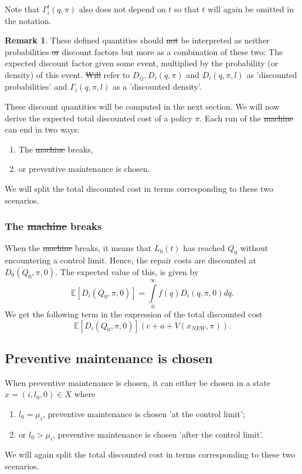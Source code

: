 \documentclass[a4paper]{thesis}
\theoremstyle{definition}
\newtheorem{remark}{Remark}[chapter]
\providecommand{\DIFaddtex}[1]{{\protect\color{blue}\uwave{#1}}} %
\providecommand{\DIFdeltex}[1]{{\protect\color{red}\sout{#1}}}                      %
\providecommand{\DIFaddbegin}{} %
\providecommand{\DIFaddend}{} %
\providecommand{\DIFdelbegin}{} %
\providecommand{\DIFdelend}{} %
\providecommand{\DIFadd}[1]{\texorpdfstring{\DIFaddtex{#1}}{#1}} %
\providecommand{\DIFdel}[1]{\texorpdfstring{\DIFdeltex{#1}}{}} %
\newcommand{\DIFscaledelfig}{0.5}
\newlength{\DIFdelgraphicswidth} %
\newlength{\DIFdelgraphicsheight} %
\newcommand{\DIFaddincludegraphics}[2][]{{\color{blue}\fbox{\DIFOincludegraphics[#1]{#2}}}} %
\newcommand{\DIFdelincludegraphics}[2][]{%
	\sbox{\DIFdelgraphicsbox}{\DIFOincludegraphics[#1]{#2}}%
	\settoboxwidth{\DIFdelgraphicswidth}{\DIFdelgraphicsbox} %
	\settoboxtotalheight{\DIFdelgraphicsheight}{\DIFdelgraphicsbox} %
	\scalebox{\DIFscaledelfig}{%
		\parbox[b]{\DIFdelgraphicswidth}{\usebox{\DIFdelgraphicsbox}\\[-\baselineskip] \rule{\DIFdelgraphicswidth}{0em}}\llap{\resizebox{\DIFdelgraphicswidth}{\DIFdelgraphicsheight}{%
				\setlength{\unitlength}{\DIFdelgraphicswidth}%
				\begin{picture}(1,1)%
				\thicklines\linethickness{2pt} %
				{\color[rgb]{1,0,0}\put(0,0){\framebox(1,1){}}}%
				{\color[rgb]{1,0,0}\put(0,0){\line( 1,1){1}}}%
				{\color[rgb]{1,0,0}\put(0,1){\line(1,-1){1}}}%
				\end{picture}%
			}\hspace*{3pt}}} %
} %
\DeclareRobustCommand{\DIFaddbegin}{\DIFOaddbegin \let\includegraphics\DIFaddincludegraphics} %
\DeclareRobustCommand{\DIFaddend}{\DIFOaddend \let\includegraphics\DIFOincludegraphics} %
\DeclareRobustCommand{\DIFdelbegin}{\DIFOdelbegin \let\includegraphics\DIFdelincludegraphics} %
\DeclareRobustCommand{\DIFdelend}{\DIFOaddend \let\includegraphics\DIFOincludegraphics} %
\begin{document}
	Note that $\Gamma_i^t(q,\pi)$ also does not depend on $t$ so that $t$ will again be omitted in the notation.
	\begin{remark}
		These defined quantities should \DIFdelbegin \DIFdel{not }\DIFdelend be interpreted as neither probabilities \DIFdelbegin \DIFdel{or }\DIFdelend \DIFaddbegin \DIFadd{nor }\DIFaddend discount factors but more as a combination of these two: The expected discount factor given some event, multiplied by the probability (or density) of this event.
		\DIFdelbegin \DIFdel{Will }\DIFdelend \DIFaddbegin \DIFadd{We will }\DIFaddend refer to $D_{ij},D_{i}(q,\pi)$ and $D_{i}(q,\pi,l)$ as 'discounted probabilities' and $\Gamma_i(q,\pi,l)$ as a 'discounted density'.
	\end{remark}
	These discount quantities will be computed in the next section.
	We will now derive the expected total discounted cost of a policy $\pi$.
	Each run of the \DIFdelbegin \DIFdel{machine }\DIFdelend \DIFaddbegin \DIFadd{asset }\DIFaddend can end in two ways:
	\begin{enumerate}
		\item The \DIFdelbegin \DIFdel{machine }\DIFdelend \DIFaddbegin \DIFadd{asset }\DIFaddend breaks,
		\item or preventive maintenance is chosen.
	\end{enumerate}
	We will split the total discounted cost in terms corresponding to these two scenarios.
	
	\subsubsection{The \DIFdelbegin \DIFdel{machine }\DIFdelend \DIFaddbegin \DIFadd{asset }\DIFaddend breaks}
	When the \DIFdelbegin \DIFdel{machine }\DIFdelend \DIFaddbegin \DIFadd{asset }\DIFaddend breaks, it means that $L_0(t)$ has reached $Q_0$ without encountering a control limit.
	Hence, the repair costs are discounted at $D_0(Q_0,\pi,0)$.
	The expected value of this, is given by
	\[
	\mathbb{E}[D_{i}(Q_0,\pi,0)]=\int\limits_0^\infty f(q)D_{i}(q,\pi,0)dq.
	\]
	We get the following term in the expression of the total discounted cost
	\[
	\mathbb{E}[D_{i}(Q_0,\pi,0)](c+a+V(x_{NEW},\pi)).
	\]
	
	\subsection{Preventive maintenance is chosen}
	When preventive maintenance is chosen, it can either be chosen in a state $x=(i,l_0,0)\in X$ where
	\begin{enumerate}
		\item $l_0=\mu_i$, preventive maintenance is chosen 'at the control limit';
		\item or $l_0>\mu_i$, preventive maintenance is chosen 'after the control limit'.
	\end{enumerate}
	We will again split the total discounted cost in terms corresponding to these two scenarios.
	
\end{document}
